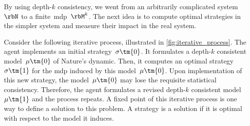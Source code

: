 \begin{figure}[htp]
\centering
{}
\label{fig:agent_knowledge_single-agent_empirical_model}
\end{figure}

\begin{sidewaysfigure}
\centering
{}
\label{fig:agent_knowledge_single-agent_empirical_emphasized_depth_k}
\end{sidewaysfigure}

By using depth-\(k\) consistency, we went from an arbitrarily complicated system~\(\rbN\) to a finite~\ac{mdp}~\(\rbM\K\).
The next idea is to compute optimal strategies in the simpler system and measure their impact in the real system.

Consider the following iterative process, illustrated in \cref{fig:iterative_process}.
The agent implements an initial strategy~\(\sigma\tm{0}\).
It formulates a depth-\(k\) consistent model~\(\mu\tm{0}\) of Nature's dynamic.
Then, it computes an optimal strategy~\(\sigma\tm{1}\) for the \ac{mdp} induced by this model~\(\mu\tm{0}\).
Upon implementation of this new strategy, the model~\(\mu\tm{0}\) may lose the requisite statistical consistency.
Therefore, the agent formulates a revised depth-\(k\) consistent model~\(\mu\tm{1}\) and the process repeats.
A fixed point of this iterative process is one way to define a solution to this problem.
A strategy is a solution if it is optimal with respect to the model it induces.

